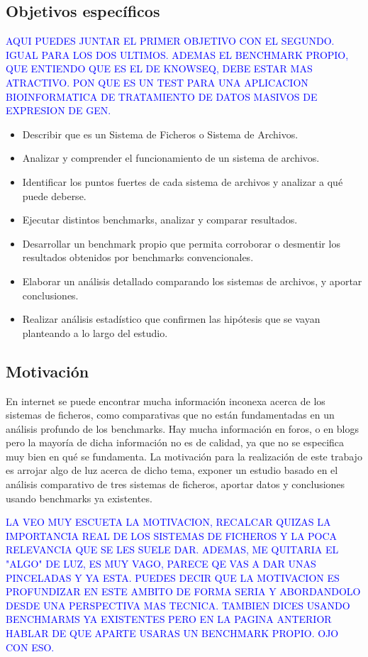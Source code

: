 \subsection{Objetivos específicos}
\textcolor{blue}{AQUI PUEDES JUNTAR EL PRIMER OBJETIVO CON EL SEGUNDO. IGUAL PARA LOS DOS ULTIMOS. ADEMAS EL BENCHMARK PROPIO, QUE ENTIENDO QUE ES EL DE KNOWSEQ, DEBE ESTAR MAS ATRACTIVO. PON QUE ES UN TEST PARA UNA APLICACION BIOINFORMATICA DE TRATAMIENTO DE DATOS MASIVOS DE EXPRESION DE GEN.}
\begin{itemize}
    \item Describir que es un Sistema de Ficheros o Sistema de Archivos.
    \item Analizar y comprender el funcionamiento de un sistema de archivos.
    \item Identificar los puntos fuertes de cada sistema de archivos y analizar a qué puede deberse.
    \item Ejecutar distintos benchmarks, analizar y comparar resultados.
    \item Desarrollar un benchmark propio que permita corroborar o desmentir los resultados obtenidos por benchmarks convencionales.
    \item Elaborar un análisis detallado comparando los sistemas de archivos, y aportar conclusiones.
    \item Realizar análisis estadístico que confirmen las hipótesis que se vayan planteando a lo largo del estudio.
\end{itemize}

\subsection{Motivación}
En internet se puede encontrar mucha información inconexa acerca de los sistemas de ficheros, como comparativas que no están fundamentadas en un análisis profundo de los benchmarks. Hay mucha información en foros, o en blogs pero la mayoría de dicha información no es de calidad, ya que no se especifica muy bien en qué se fundamenta. La motivación para la realización de este trabajo es arrojar algo de luz acerca de dicho tema, exponer un estudio basado en el análisis comparativo de tres sistemas de ficheros, aportar datos y conclusiones usando benchmarks ya existentes. 

\textcolor{blue}{LA VEO MUY ESCUETA LA MOTIVACION, RECALCAR QUIZAS LA IMPORTANCIA REAL DE LOS SISTEMAS DE FICHEROS Y LA POCA RELEVANCIA QUE SE LES SUELE DAR. ADEMAS, ME QUITARIA EL "ALGO" DE LUZ, ES MUY VAGO, PARECE QE VAS A DAR UNAS PINCELADAS Y YA ESTA. PUEDES DECIR QUE LA MOTIVACION ES PROFUNDIZAR EN ESTE AMBITO DE FORMA SERIA Y ABORDANDOLO DESDE UNA PERSPECTIVA MAS TECNICA. TAMBIEN DICES USANDO BENCHMARMS YA EXISTENTES PERO EN LA PAGINA ANTERIOR HABLAR DE QUE APARTE USARAS UN BENCHMARK PROPIO. OJO CON ESO.}

